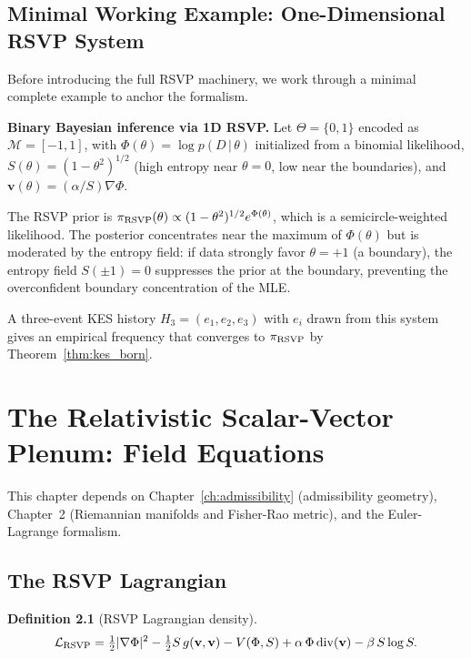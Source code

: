 \documentclass[11pt, openright, twoside]{book}
\theoremstyle{plain}
\theoremstyle{definition}
\newtheorem{definition}[theorem]{Definition}
\theoremstyle{remark}
\newcommand{\vfield}{\mathbf{v}}
\newcommand{\Sfield}{S}
\newcommand{\given}{\,|\,}
\begin{document}
\section{Minimal Working Example: One-Dimensional RSVP System}

Before introducing the full RSVP machinery, we work through a minimal complete example
to anchor the formalism.

\begin{exbox}
\textbf{Binary Bayesian inference via 1D RSVP.} Let $\Theta=\{0,1\}$ encoded as
$\mathcal{M}=[-1,1]$, with $\Phi(\theta)=\log p(D\given\theta)$ initialized from a
binomial likelihood, $\Sfield(\theta)=(1-\theta^2)^{1/2}$ (high entropy near $\theta=0$,
low near the boundaries), and $\vfield(\theta)=(\alpha/\Sfield)\nabla\Phi$.

The RSVP prior is
$\pi_{\rm RSVP}(\theta)\propto(1-\theta^2)^{1/2}e^{\Phi(\theta)}$,
which is a semicircle-weighted likelihood. The posterior concentrates near the maximum of
$\Phi(\theta)$ but is moderated by the entropy field: if data strongly favor $\theta=+1$
(a boundary), the entropy field $\Sfield(\pm 1)=0$ suppresses the prior at the boundary,
preventing the overconfident boundary concentration of the MLE.

A three-event KES history $H_3=(e_1,e_2,e_3)$ with $e_i$ drawn from this system gives
an empirical frequency that converges to $\pi_{\rm RSVP}$ by Theorem~\ref{thm:kes_born}.
\end{exbox}

\chapter{The Relativistic Scalar-Vector Plenum: Field Equations}

\begin{depbox}
This chapter depends on Chapter~\ref{ch:admissibility} (admissibility geometry),
Chapter~2 (Riemannian manifolds and Fisher-Rao metric), and the Euler-Lagrange formalism.
\end{depbox}

\section{The RSVP Lagrangian}

\begin{definition}[RSVP Lagrangian density]
\begin{equation}
  \mathcal{L}_{\rm RSVP} = \tfrac{1}{2}|\nabla\Phi|^2
  - \tfrac{1}{2}\Sfield\,g(\vfield,\vfield)
  - V(\Phi,\Sfield)
  + \alpha\,\Phi\operatorname{div}(\vfield)
  - \beta\,\Sfield\log\Sfield.
  \label{eq:rsvp_lagrangian}
\end{equation}
\end{definition}
\end{document}
